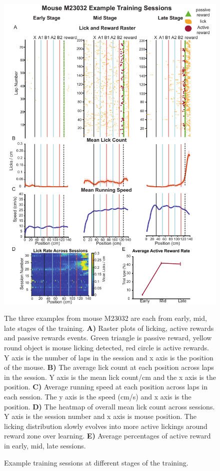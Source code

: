 \begin{figure}
    \centering
    \includegraphics[width=1\linewidth]{figures//Chapter 3 Behaviour//Thesis Figures//figure_PDFs/fig2_example_sessions.pdf}
    \caption{Example training sessions at different stages of the training.}
\medskip
\small
 The three examples from mouse M23032 are each from early, mid, late stages of the training. \textbf{A)} Raster plots of licking, active rewards and passive rewards events. Green triangle is passive reward, yellow round object is mouse licking detected, red circle is active rewards. Y axis is the number of laps in the session and x axis is the position of the mouse. \textbf{B)} The average lick count at each position across laps in the session. Y axis is the mean lick count/cm and the x axis is the position. \textbf{C)} Average running speed at each position across laps in each session. The y axis is the speed (cm/s) and x axis is the position. \textbf{D)} The heatmap of overall mean lick count across sessions. Y axis is the session number and x axis is mouse position. The licking distribution slowly evolves into more active lickings around reward zone over learning. \textbf{E)} Average percentages of active reward in early, mid, late sessions. 
    \label{fig:example training sessions}
\end{figure}



